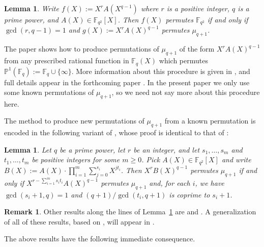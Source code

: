 \documentclass[11pt]{amsart}
\newtheorem{lemma}[equation]{Lemma}
\theoremstyle{definition}
\newtheorem*{rmk}{Remark}
\newcommand{\F}{\mathbb{F}}
\newcommand{\bP}{\mathbb{P}}
\begin{document}
\begin{lemma}\label{old}
Write $f(X):=X^r A(X^{q-1})$ where $r$ is a positive integer, $q$ is a prime power, and $A(X)\in\F_{q^2}[X]$.  Then $f(X)$ permutes\/ $\F_{q^2}$ if and only if $\gcd(r,q-1)=1$ and $g(X):=X^r A(X)^{q-1}$ permutes $\mu_{q+1}$.
\end{lemma}

The paper \cite{ZR} shows how to produce permutations of $\mu_{q+1}$ of the form $X^r A(X)^{q-1}$ from any prescribed rational function in $\F_q(X)$ which permutes $\bP^1(\F_q):=\F_q\cup\{\infty\}$.  More information about this procedure is given in \cite{Zx}, and full details appear in the forthcoming paper \cite{pp-struc1}.  In the present paper we only use some known permutations of $\mu_{q+1}$, so we need not say more about this procedure here.

The method to produce new permutations of $\mu_{q+1}$ from a known permutation is encoded in the following variant of \cite[Cor.~1]{DeZh}, whose proof is identical to that of \cite[Cor.~1]{DeZh}:

\begin{lemma}\label{SR}
Let $q$ be a prime power, let $r$ be an integer, and let $s_1,\dots,s_m$ and $t_1,\dots,t_m$ be positive integers for some $m\ge 0$.  Pick $A(X)\in\F_{q^2}[X]$ and write $B(X):=A(X)\cdot\prod_{i=1}^m \sum_{j=0}^{s_i} X^{jt_i}$.  Then $X^r B(X)^{q-1}$ permutes $\mu_{q+1}$ if and only if $X^{r-\sum_{i=1}^m s_it_i} A(X)^{q-1}$ permutes $\mu_{q+1}$ and, for each $i$, we have $\gcd(s_i+1,q)=1$ and $(q+1)/\gcd(t_i,q+1)$ is coprime to $s_i+1$.
\end{lemma}

\begin{rmk}
Other results along the lines of Lemma~\ref{SR} are
\cite[Lemma~4.2]{ZHF} and \cite[Lemma~4.1]{XCP}.  A generalization of all of these results, based on \cite[Thm.~5.1]{ZR}, will appear in \cite{pp-struc1}.
\end{rmk}

The above results have the following immediate consequence.

\renewcommand{\theenumi}{\thethm.\arabic{enumi}}
\renewcommand{\labelenumi}{(\thethm.\arabic{enumi})}
\end{document}
